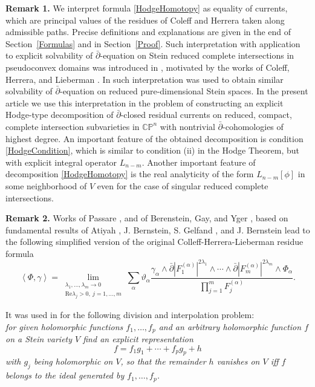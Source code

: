 \documentclass[11pt,reqno]{amsart}
\numberwithin{equation}{section}
\begin{document}
{\bf Remark 1.} We interpret formula \eqref{HodgeHomotopy} as equality of currents,
which are principal values of the residues of Coleff and Herrera taken along admissible paths.
Precise definitions and explanations are given in the end of Section~\ref{Formulas}
and in Section~\ref{Proof}. Such interpretation with application to explicit solvability
of $\bar\partial$-equation on Stein reduced complete intersections in
pseudoconvex domains was introduced in \cite{HP2}, motivated by the works of Coleff,
Herrera, and Lieberman \cite{CH, HL}.
In \cite{AS1, AS2} such interpretation was used to obtain similar
solvability of $\bar\partial$-equation on reduced pure-dimensional Stein spaces.
In the present article we use this interpretation in the problem of constructing an explicit 
Hodge-type decomposition of $\bar\partial$-closed residual currents on reduced, compact,
complete intersection subvarieties in ${{\mathbb C}}{{\mathbb P}}^n$ with nontrivial $\bar\partial$-cohomologies
of highest degree. An important feature of the obtained decomposition is condition
\eqref{HodgeCondition}, which is similar to condition (ii) in the Hodge Theorem,
but with explicit integral operator $L_{n-m}$. Another important feature of decomposition
\eqref{HodgeHomotopy} is the real analyticity of the form $L_{n-m}[\phi]$
in some neighborhood of $V$ even for the case of singular reduced complete intersections.

{\bf Remark 2.} Works of Passare \cite{Pa1, Pa2}, and of Berenstein, Gay, and Yger \cite{BGY},
based on fundamental results of Atiyah \cite{At}, J. Bernstein, S. Gelfand \cite{BG},
and J. Bernstein \cite{Be} lead to the following simplified version of the original
Colleff-Herrera-Lieberman residue formula
$$\left\langle\Phi,\gamma\right\rangle
=\lim_{\begin{array}{ll}
\lambda_1,\dots,\lambda_m\to 0\\
\text{Re}\lambda_j>0,\ j=1,\dots,m
\end{array}}
\sum_{\alpha}\vartheta_{\alpha}\frac{\gamma_{\alpha}
\wedge\bar\partial\left|F_1^{(\alpha)}\right|^{2\lambda_1}\wedge\cdots
\wedge\bar\partial\left|F_m^{(\alpha)}\right|^{2\lambda_m}\wedge\Phi_{\alpha}}
{\prod_{j=1}^mF_j^{(\alpha)}}.$$

\indent
It was used in \cite{BGY} for the following division and interpolation problem:\\
\indent
{\it for given holomorphic functions $f_1, \dots, f_p$ and an arbitrary holomorphic
function $f$ on a Stein variety $V$ find an explicit representation
$$f = f_1g_1 +\cdots + f_pg_p + h$$
with $g_j$ being holomorphic on $V$, so that the remainder $h$ vanishes
on $V$ iff $f$ belongs to the ideal generated by $f_1, \dots, f_p$.}
\end{document}

